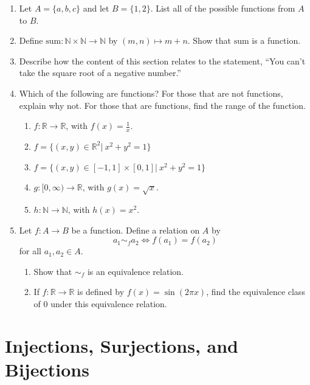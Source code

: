 \documentclass[
]{book}
\theoremstyle{definition}
\theoremstyle{definition}
\theoremstyle{definition}
\theoremstyle{definition}
\theoremstyle{remark}
\begin{document}
\begin{enumerate}
\def\labelenumi{\arabic{enumi}.}
\item
  Let \(A=\{a,b,c\}\) and let \(B=\{1,2\}\). List all of the possible functions from \(A\) to \(B\).
\item
  Define \(\mathrm{sum}:\mathbb{N}\times \mathbb{N} \rightarrow \mathbb{N}\) by \((m,n) \mapsto m+n\). Show that \(\mathrm{sum}\) is a function.
\item
  Describe how the content of this section relates to the statement, ``You can't take the square root of a negative number.''
\item
  Which of the following are functions? For those that are not functions, explain why not. For those that are functions, find the range of the function.

  \begin{enumerate}
  \def\labelenumii{\alph{enumii}.}
  \item
    \(f:\mathbb{R} \rightarrow \mathbb{R}\), with \(f(x)=\frac{1}{x}\).
  \item
    \(f= \{(x,y)\in \mathbb{R}^2\vert \: x^2+y^2=1\}\)
  \item
    \(f= \{(x,y) \in [-1,1]\times [0,1] \vert \: x^2+y^2=1\}\)
  \item
    \(g:[0,\infty) \rightarrow \mathbb{R}\), with \(g(x)=\sqrt{x}\).
  \item
    \(h:\mathbb{N} \rightarrow \mathbb{N}\), with \(h(x)=x^2\).
  \end{enumerate}
\item
  Let \(f:A\rightarrow B\) be a function. Define a relation on \(A\) by \[a_1 \sim_f a_2 \Leftrightarrow f(a_1)=f(a_2)\] for all \(a_1,a_2\in A\).

  \begin{enumerate}
  \def\labelenumii{\alph{enumii}.}
  \item
    Show that \(\sim_f\) is an equivalence relation.
  \item
    If \(f:\mathbb{R} \rightarrow \mathbb{R}\) is defined by \(f(x)=\sin(2\pi x)\), find the equivalence class of \(0\) under this equivalence relation.
  \end{enumerate}
\end{enumerate}

\hypertarget{Bijection}{%
\section{Injections, Surjections, and Bijections}\label{Bijection}}
\end{document}
